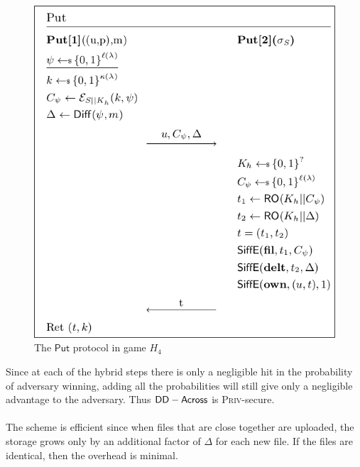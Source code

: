 \begin{figure}[H]
	\centering
	\includegraphics[scale=0.4]{H4}
	\caption{The $\mathsf{Put}$ protocol in game $H_4$}
\end{figure}        

Since at each of the hybrid steps there is only a negligible hit in the probability of adversary winning, adding all the probabilities will still give only a negligible advantage to the adversary. Thus $\mathsf{DD-Across}$ is \textsc{Priv}-secure.\\ \\
The scheme is efficient since when files that are close together are uploaded, the storage grows only by an additional factor of $\Delta$ for each new file. If the files are identical, then the overhead is minimal.